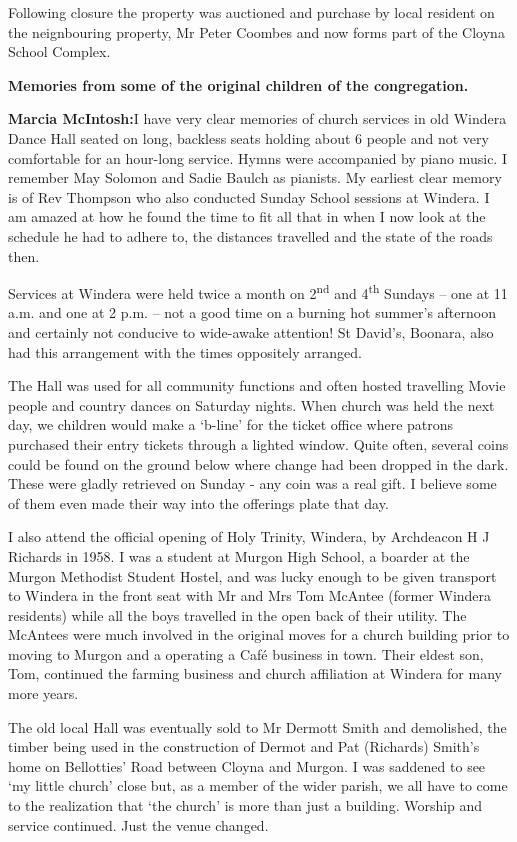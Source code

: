 Following closure the property was auctioned and purchase by local resident on the neignbouring property, Mr Peter Coombes and now forms part of the Cloyna School Complex.

\textbf{Memories from some of the original children of the congregation.}

\textbf{Marcia McIntosh:}I have very clear memories of church services in old Windera Dance Hall seated on long, backless seats holding about 6 people and not very comfortable for an hour-long service. Hymns were accompanied by piano music. I remember May Solomon and Sadie Baulch as pianists. My earliest clear memory is of Rev Thompson who also conducted Sunday School sessions at Windera. I am amazed at how he found the time to fit all that in when I now look at the schedule he had to adhere to, the distances travelled and the state of the roads then.

Services at Windera were held twice a month on 2\textsuperscript{nd} and 4\textsuperscript{th} Sundays -- one at 11 a.m. and one at 2 p.m. -- not a good time on a burning hot summer's afternoon and certainly not conducive to wide-awake attention! St David's, Boonara, also had this arrangement with the times oppositely arranged.

The Hall was used for all community functions and often hosted travelling Movie people and country dances on Saturday nights. When church was held the next day, we children would make a `b-line' for the ticket office where patrons purchased their entry tickets through a lighted window. Quite often, several coins could be found on the ground below where change had been dropped in the dark. These were gladly retrieved on Sunday - any coin was a real gift. I believe some of them even made their way into the offerings plate that day.

I also attend the official opening of Holy Trinity, Windera, by Archdeacon H J Richards in 1958. I was a student at Murgon High School, a boarder at the Murgon Methodist Student Hostel, and was lucky enough to be given transport to Windera in the front seat with Mr and Mrs Tom McAntee (former Windera residents) while all the boys travelled in the open back of their utility. The McAntees were much involved in the original moves for a church building prior to moving to Murgon and a operating a Café business in town. Their eldest son, Tom, continued the farming business and church affiliation at Windera for many more years.

The old local Hall was eventually sold to Mr Dermott Smith and demolished, the timber being used in the construction of Dermot and Pat (Richards) Smith's home on Bellotties' Road between Cloyna and Murgon. I was saddened to see `my little church' close but, as a member of the wider parish, we all have to come to the realization that `the church' is more than just a building. Worship and service continued. Just the venue changed.

